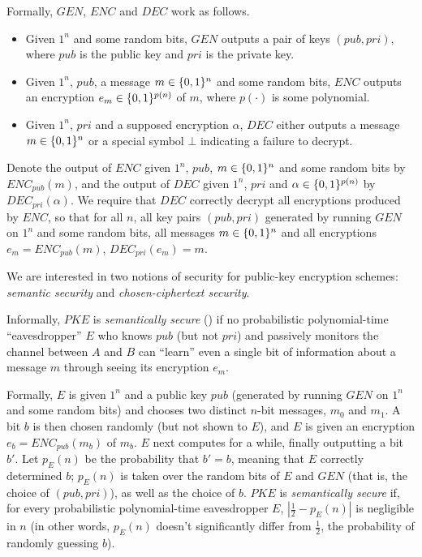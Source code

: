 Formally, $GEN$, $ENC$ and $DEC$ work as follows.

\begin{itemize}

\item Given $1^n$ and some random bits, $GEN$ outputs a pair of keys
$(pub,pri)$, where $pub$ is the public key and $pri$ is the private key.

\item Given $1^n$, $pub$, a message $m \in \{0,1\}^{n}$ and some random bits,
$ENC$ outputs an encryption $e_m \in \{0,1\}^{p(n)}$ of $m$, where $p(\cdot)$ is
some polynomial.

\item Given $1^n$, $pri$ and a supposed encryption $\alpha$, $DEC$ either
outputs a message $m \in \{0,1\}^{n}$ or a special symbol $\bot$ indicating a
failure to decrypt.

\end{itemize}
Denote the output of $ENC$ given $1^n$, $pub$, $m \in \{0,1\}^{n}$ and some random
bits by $ENC_{pub}(m)$, and the output of $DEC$ given $1^n$, $pri$ and 
$\alpha \in \{0,1\}^{p(n)}$ by $DEC_{pri}(\alpha)$.  We require that $DEC$
correctly decrypt all encryptions produced by $ENC$, so that for all $n$, all
key pairs $(pub,pri)$ generated by running $GEN$ on $1^n$ and some random bits,
all messages $m \in \{0,1\}^{n}$ and all encryptions $e_m = ENC_{pub}(m)$,
$DEC_{pri}(e_m) = m$. 

We are interested in two notions of security for public-key encryption
schemes: {\it semantic security} and {\it chosen-ciphertext security}.

Informally, $PKE$ is {\it semantically secure} (\cite{goldwasser:probenc2}) if
no probabilistic polynomial-time ``eavesdropper'' $E$ who knows $pub$ (but not
$pri$) and passively monitors the channel between $A$ and $B$ can ``learn''
even a single bit of information about a message $m$ through seeing its
encryption $e_m$. 

Formally, $E$ is given $1^n$ and a public key $pub$ (generated by running
$GEN$ on $1^n$ and some random bits) and chooses two distinct $n$-bit
messages, $m_0$ and $m_1$. A bit $b$ is then chosen randomly (but not shown to
$E$), and $E$ is given an encryption $e_b = ENC_{pub}(m_b)$ of $m_b$. $E$ next
computes for a while, finally outputting a bit $b'$. Let $p_{E}(n)$ be the
probability that $b' = b$, meaning that $E$ correctly determined $b$;
$p_{E}(n)$ is taken over the random bits of $E$ and $GEN$ (that is, the choice
of $(pub,pri)$), as well as the choice of $b$.  $PKE$ is {\it semantically
secure} if, for every probabilistic polynomial-time eavesdropper $E$,
$|\frac{1}{2} - p_{E}(n)|$ is negligible in $n$ (in other words, $p_{E}(n)$
doesn't significantly differ from $\frac{1}{2}$, the probability of randomly
guessing $b$).

